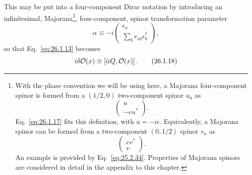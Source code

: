 This may be put into a four-component Dirac notation by introducing an
infinitesimal, Majorana\footnote{With the phase convention we will be using
here, a Majorana four-component spinor is formed from a \((1/2,0)\)
two-component spinor \(u_a\) as
\[
  \begin{pmatrix}u\\-eu^*\end{pmatrix}.
\]
Eq.~\eqref{eq:26.1.17} fits this definition, with \(u=-i\epsilon\).
Equivalently, a Majorana spinor can be formed from a two-component
\((0,1/2)\) spinor \(v_a\) as
\[
  \begin{pmatrix}ev^*\\v\end{pmatrix}.
\]
An example is provided by Eq.~\eqref{eq:25.2.34}. Properties of Majorana
spinors are considered in detail in the appendix to this chapter.},
four-component, spinor transformation parameter
\begin{equation}
  \alpha\equiv-i
  \begin{pmatrix}
    \epsilon_a\\
    \displaystyle\sum_b e_{ab}\epsilon_b^*
  \end{pmatrix},
  \tag{26.1.17}\label{eq:26.1.17}
\end{equation}
so that Eq.~\eqref{eq:26.1.13} becomes
\begin{equation}
  i\delta\mathcal{O}(x)\equiv
  [\bar{\alpha}Q,\mathcal{O}(x)]\,.
  \tag{26.1.18}\label{eq:26.1.18}
\end{equation}

